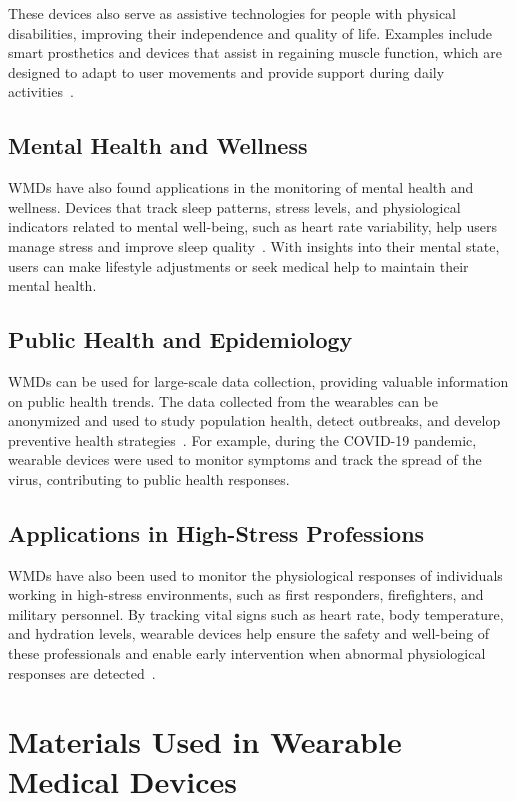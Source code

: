 \documentclass[journal]{IEEEtran}
\begin{document}
    These devices also serve as assistive technologies for people with physical disabilities, improving their independence and quality of life. Examples include smart prosthetics and devices that assist in regaining muscle function, which are designed to adapt to user movements and provide support during daily activities~\cite{Dias2018}.

    \subsection{Mental Health and Wellness}

    WMDs have also found applications in the monitoring of mental health and wellness. Devices that track sleep patterns, stress levels, and physiological indicators related to mental well-being, such as heart rate variability, help users manage stress and improve sleep quality~\cite{Iqbal2016}. With insights into their mental state, users can make lifestyle adjustments or seek medical help to maintain their mental health.

    \subsection{Public Health and Epidemiology}

    WMDs can be used for large-scale data collection, providing valuable information on public health trends. The data collected from the wearables can be anonymized and used to study population health, detect outbreaks, and develop preventive health strategies~\cite{Cusack2024}. For example, during the COVID-19 pandemic, wearable devices were used to monitor symptoms and track the spread of the virus, contributing to public health responses.

    \subsection{Applications in High-Stress Professions}

    WMDs have also been used to monitor the physiological responses of individuals working in high-stress environments, such as first responders, firefighters, and military personnel. By tracking vital signs such as heart rate, body temperature, and hydration levels, wearable devices help ensure the safety and well-being of these professionals and enable early intervention when abnormal physiological responses are detected~\cite{Lu2020}.

\section{Materials Used in Wearable Medical Devices}
\label{6.Materials}
\end{document}
